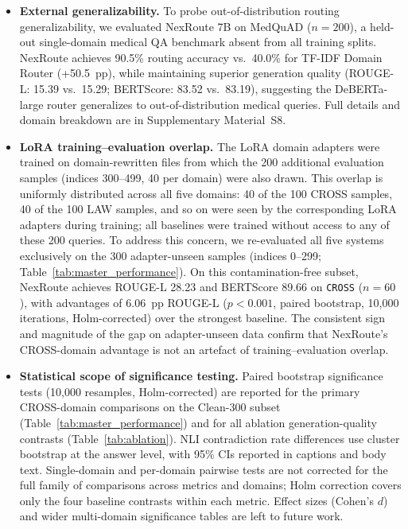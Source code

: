\documentclass[a4paper,fleql,doubleblind]{cas-sc}
\begin{document}
\begin{itemize}
These measures reduce, but do not eliminate, the circularity risk; lexical
metrics such as ROUGE-L and BERTScore should be interpreted with this
shared-lineage caveat in mind, particularly for comparisons against Qwen-family
72B baselines.
An earlier attempt to use Llama-3.1-70B-Instruct as an
independent judge ($n{=}200$) revealed a ceiling effect (92.5\% of scores at 9/10,
inter-model range ${<}0.3$ points; see Section~\ref{sec:factuality}),
motivating our adoption of sentence-level NLI as the primary factuality metric.
\item \textbf{External generalizability.}
To probe out-of-distribution routing generalizability, we evaluated NexRoute 7B
on MedQuAD \citep{ben2019question} ($n{=}200$), a held-out single-domain medical
QA benchmark absent from all training splits. NexRoute achieves 90.5\% routing
accuracy vs.\ 40.0\% for TF-IDF Domain Router (+50.5~pp), while maintaining superior
generation quality (ROUGE-L: 15.39 vs.\ 15.29; BERTScore: 83.52 vs.\ 83.19),
suggesting the DeBERTa-large router generalizes to out-of-distribution medical
queries. Full details and domain breakdown are in Supplementary Material~S8.
\item \textbf{LoRA training--evaluation overlap.}
The LoRA domain adapters were trained on domain-rewritten files from which
the 200 additional evaluation samples (indices 300--499, 40 per domain) were
also drawn. This overlap is uniformly distributed across all five domains:
40 of the 100 CROSS samples, 40 of the 100 LAW samples, and so on were seen
by the corresponding LoRA adapters during training; all baselines were trained
without access to any of these 200 queries.
To address this concern, we re-evaluated all five systems exclusively on the
300 adapter-unseen samples (indices 0--299; Table~\ref{tab:master_performance}).
On this contamination-free subset, NexRoute achieves ROUGE-L 28.23 and
BERTScore 89.66 on \texttt{CROSS} ($n{=}60$), with advantages of 6.06~pp
ROUGE-L ($p{<}0.001$, paired bootstrap, 10,000 iterations, Holm-corrected)
over the strongest baseline. The consistent sign and magnitude of the gap on
adapter-unseen data confirm that NexRoute's CROSS-domain advantage is not
an artefact of training--evaluation overlap.

\item \textbf{Statistical scope of significance testing.}
Paired bootstrap significance tests (10,000 resamples, Holm-corrected) are
reported for the primary CROSS-domain comparisons on the Clean-300 subset
(Table~\ref{tab:master_performance}) and for all ablation generation-quality
contrasts (Table~\ref{tab:ablation}). NLI contradiction rate differences use cluster
bootstrap at the answer level, with 95\% CIs reported in captions and body text.
Single-domain and per-domain pairwise tests are not corrected for the full family
of comparisons across metrics and domains; Holm correction covers only the four
baseline contrasts within each metric.
Effect sizes (Cohen's $d$) and wider multi-domain significance tables are
left to future work.


\end{itemize}
\end{document}
